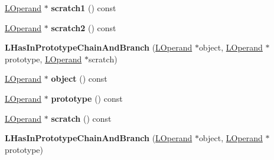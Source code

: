 \begin{DoxyCompactItemize}
\item 
\hyperlink{classv8_1_1internal_1_1_l_operand}{L\+Operand} $\ast$ {\bfseries scratch1} () const \hypertarget{classv8_1_1internal_1_1_l_has_in_prototype_chain_and_branch_a78f9a0a130aaa6e1a680f02fa17df033}{}\label{classv8_1_1internal_1_1_l_has_in_prototype_chain_and_branch_a78f9a0a130aaa6e1a680f02fa17df033}

\item 
\hyperlink{classv8_1_1internal_1_1_l_operand}{L\+Operand} $\ast$ {\bfseries scratch2} () const \hypertarget{classv8_1_1internal_1_1_l_has_in_prototype_chain_and_branch_a69b7ceaccfd2fb77debcc5b1cc37da72}{}\label{classv8_1_1internal_1_1_l_has_in_prototype_chain_and_branch_a69b7ceaccfd2fb77debcc5b1cc37da72}

\item 
{\bfseries L\+Has\+In\+Prototype\+Chain\+And\+Branch} (\hyperlink{classv8_1_1internal_1_1_l_operand}{L\+Operand} $\ast$object, \hyperlink{classv8_1_1internal_1_1_l_operand}{L\+Operand} $\ast$prototype, \hyperlink{classv8_1_1internal_1_1_l_operand}{L\+Operand} $\ast$scratch)\hypertarget{classv8_1_1internal_1_1_l_has_in_prototype_chain_and_branch_a6ae8ccffa4e36d7001700a38a921b5f2}{}\label{classv8_1_1internal_1_1_l_has_in_prototype_chain_and_branch_a6ae8ccffa4e36d7001700a38a921b5f2}

\item 
\hyperlink{classv8_1_1internal_1_1_l_operand}{L\+Operand} $\ast$ {\bfseries object} () const \hypertarget{classv8_1_1internal_1_1_l_has_in_prototype_chain_and_branch_a495e5c90fae5975c86c05b81abc64eb7}{}\label{classv8_1_1internal_1_1_l_has_in_prototype_chain_and_branch_a495e5c90fae5975c86c05b81abc64eb7}

\item 
\hyperlink{classv8_1_1internal_1_1_l_operand}{L\+Operand} $\ast$ {\bfseries prototype} () const \hypertarget{classv8_1_1internal_1_1_l_has_in_prototype_chain_and_branch_a064d5fd47ecfd5cadfaf5453641d0217}{}\label{classv8_1_1internal_1_1_l_has_in_prototype_chain_and_branch_a064d5fd47ecfd5cadfaf5453641d0217}

\item 
\hyperlink{classv8_1_1internal_1_1_l_operand}{L\+Operand} $\ast$ {\bfseries scratch} () const \hypertarget{classv8_1_1internal_1_1_l_has_in_prototype_chain_and_branch_a6f1cd6c0894efda40cecf24852d48c0d}{}\label{classv8_1_1internal_1_1_l_has_in_prototype_chain_and_branch_a6f1cd6c0894efda40cecf24852d48c0d}

\item 
{\bfseries L\+Has\+In\+Prototype\+Chain\+And\+Branch} (\hyperlink{classv8_1_1internal_1_1_l_operand}{L\+Operand} $\ast$object, \hyperlink{classv8_1_1internal_1_1_l_operand}{L\+Operand} $\ast$prototype)\hypertarget{classv8_1_1internal_1_1_l_has_in_prototype_chain_and_branch_a986107e75af400f0ecb8ad0edc1d6c17}{}\label{classv8_1_1internal_1_1_l_has_in_prototype_chain_and_branch_a986107e75af400f0ecb8ad0edc1d6c17}


\end{DoxyCompactItemize}
